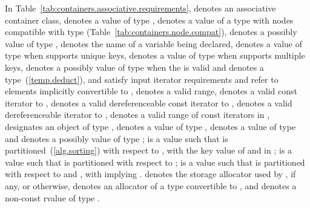 \pnum
In Table~\ref{tab:containers.associative.requirements},
 denotes an associative container class,
 denotes a value of type ,
 denotes a value of a type with nodes compatible with type
 (Table~\ref{tab:containers.node.compat}),
 denotes a possibly  value of type ,
 denotes the name of a variable being declared,
 denotes a value of type 
when  supports unique keys,
 denotes a value of type 
when  supports multiple keys,
 denotes a possibly  value of type 
when the 
 is valid
and denotes a type~(\ref{temp.deduct}),
 and 
satisfy input iterator requirements and refer to elements
implicitly convertible to
, 
denotes a valid range,
 denotes a valid const iterator to ,
 denotes a valid dereferenceable const iterator to ,
 denotes a valid dereferenceable iterator to ,
\tcode{[q1, q2)} denotes a valid range of const iterators in ,
 designates an object of type ,
 denotes a value of type ,
 denotes a value of type 
and  denotes a possibly  value of type ;
 is a value such that  is partitioned~(\ref{alg.sorting})
with respect to , with  the key value of 
and  in ;
 is a value such that  is partitioned with respect to
;
 is a value such that  is partitioned with respect to
 and , with  implying
.
 denotes the storage allocator used by , if any, or  otherwise,
 denotes an allocator of a type convertible to ,
and  denotes a non-const rvalue of type .

